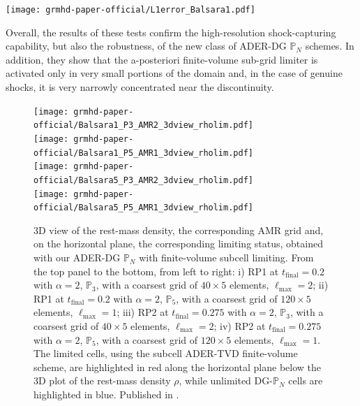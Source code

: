 \begin{marginfigure}
	\texttt{[image: grmhd-paper-official/L1error\_Balsara1.pdf]}
	\caption[
	Riemann problem convergence plot 
	]{  Convergence study against Riemann problem
		RP2 of Table \protect\ref{tab:RP1D}. $L_1$ errors are plotted against 
		the
		discretization step $\Delta x=L/N_x$, with $L=1$ being the length
		of the one-dimensional domain, $N_x$ the discretization number, \ie
		the number of high-order space-elements in the $x$-direction. %
		Published in \cite{Fambri2018}.
	} \label{fig:CTRP}
\end{marginfigure}

Overall, the results of these tests confirm the high-resolution
shock-capturing capability, but also the robustness, of the new class of
ADER-DG $\mathbb{P}_N$ schemes. In addition, they show that the
{a-posteriori} finite-volume {sub-grid} limiter is activated only in very
small portions of the domain and, in the case of genuine shocks, it is
very narrowly concentrated near the discontinuity.
%
\begin{figure}[h]
    \texttt{[image: grmhd-paper-official/Balsara1\_P3\_AMR2\_3dview\_rholim.pdf]}
    \\
    \texttt{[image: grmhd-paper-official/Balsara1\_P5\_AMR1\_3dview\_rholim.pdf]}
    \\
    \texttt{[image: grmhd-paper-official/Balsara5\_P3\_AMR2\_3dview\_rholim.pdf]}
    \\
    \texttt{[image: grmhd-paper-official/Balsara5\_P5\_AMR1\_3dview\_rholim.pdf]}
    \caption[
       MHD Riemann problems 
    ]{ 3D view of the rest-mass density, the
      corresponding AMR grid and, on the horizontal plane, the
      corresponding limiting status, obtained with our ADER-DG
      $\mathbb{P}_N$ with finite-volume subcell limiting. From the top
      panel to the bottom, from left to right: i) RP1 at $t_{\text{final}}=0.2$ with
      $\alpha=2$, $\mathbb{P}_3$, with a coarsest grid of $40\times5$
      elements, $\ell_{\text{max}} = 2$; ii) RP1 at
      $t_{\text{final}}=0.2$ with $\alpha=2$, $\mathbb{P}_5$, with a
      coarsest grid of $120\times5$ elements, $\ell_{\text{max}} = 1$;
      iii) RP2 at $t_{\text{final}}=0.275$ with $\alpha=2$,
      $\mathbb{P}_3$, with a coarsest grid of $40\times5$ elements,
      $\ell_{\text{max}} = 2$; iv) RP2 at $t_{\text{final}}=0.275$ with
      $\alpha=2$, $\mathbb{P}_5$, with a coarsest grid of $120\times5$
      elements, $\ell_{\text{max}} = 1$. The limited cells, using the
      subcell ADER-TVD finite-volume scheme, are highlighted in red along
      the horizontal plane below the 3D plot of the rest-mass density
      $\rho$, while unlimited DG-$\mathbb{P}_N$ cells are highlighted in
      blue.
      Published in \cite{Fambri2018}.
  } \label{fig:Balsara3D} 
\end{figure}
%
%
\clearpage


